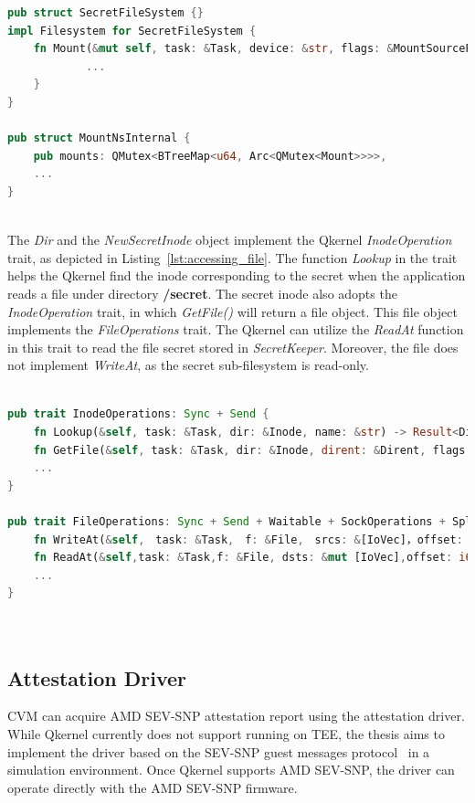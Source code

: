 \begin{lstlisting}[language=rust, caption= API for secret file system, label={lst:sub_filesystem}]
pub struct SecretFileSystem {}
impl Filesystem for SecretFileSystem {
    fn Mount(&mut self, task: &Task, device: &str, flags: &MountSourceFlags, data: &str) -> Result<Inode> {
            ...
    }
}

pub struct MountNsInternal {
    pub mounts: QMutex<BTreeMap<u64, Arc<QMutex<Mount>>>>,
    ...
}
      
\end{lstlisting}

The \emph{Dir} and the \emph{NewSecretInode} object implement the Qkernel \emph{InodeOperation} trait, as depicted in Listing~\ref{lst:accessing_file}. The function \emph{Lookup} in the trait helps the Qkernel find the inode corresponding to the secret when the application reads a file under 
directory \textbf{/secret}. The secret inode also adopts the \emph{InodeOperation} trait, in which \emph{GetFile()} will return a file object. This file object implements the \emph{FileOperations} trait. The Qkernel can utilize the \emph{ReadAt} function in this trait to read the file secret 
stored in \emph{SecretKeeper}. Moreover, the file does not implement \emph{WriteAt}, as the secret sub-filesystem is read-only.

\begin{lstlisting}[language=rust, caption= Interface for accessing the file type secrets, label={lst:accessing_file}]

pub trait InodeOperations: Sync + Send {
    fn Lookup(&self, task: &Task, dir: &Inode, name: &str) -> Result<Dirent>;
    fn GetFile(&self, task: &Task, dir: &Inode, dirent: &Dirent, flags: FileFlags) -> Result<File>;
    ...
}

pub trait FileOperations: Sync + Send + Waitable + SockOperations + SpliceOperations {
    fn WriteAt(&self,　task: &Task,　f: &File,　srcs: &[IoVec]，offset: i64,_blocking: bool) -> Result<i64>;
    fn ReadAt(&self,task: &Task,f: &File, dsts: &mut [IoVec],offset: i64, _blocking: bool,) -> Result<i64>;
    ...
}
    
      
\end{lstlisting}

\subsection{Attestation Driver}
\label{subsec:impl_Attestation_driver}
\acrshort{CVM} can acquire AMD SEV-SNP attestation report using the attestation driver. While Qkernel currently does not support running on \acrshort{TEE}, the thesis aims to implement the driver based on the SEV-SNP guest messages protocol~\cite*{snp_firmware} in a simulation environment. 
Once Qkernel supports AMD SEV-SNP, the driver can operate directly with the AMD SEV-SNP firmware. 



